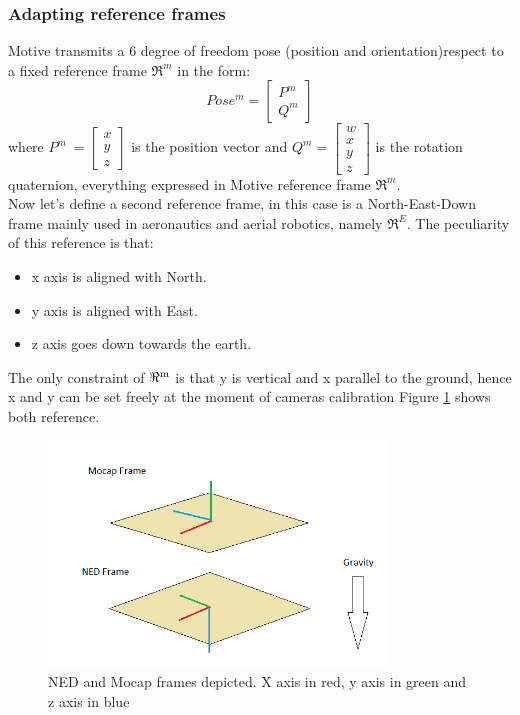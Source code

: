 \subsubsection{Adapting reference frames}
\label{sec:adaptframes}
Motive transmits a 6 degree of freedom pose (position and orientation)respect to a fixed reference frame $\Re^m$ in the form:\\ 
\begin{equation}
Pose^m = \begin{bmatrix}
P^m\\
Q^m
\end{bmatrix}
\end{equation}
 where $P^m\ = \begin{bmatrix}x\\y\\z\end{bmatrix}$ is the position vector and $Q^m =\begin{bmatrix}w\\x\\y\\z\end{bmatrix}$ is the rotation quaternion, everything expressed in Motive reference frame $\Re^m$. \\
 
 \noindent
Now let's define a second reference frame, in this case is a North-East-Down frame \cite{FrameRef}  mainly used in aeronautics and aerial robotics, namely  $\Re^E$. The peculiarity of this reference is that:

\begin{itemize}
\item x axis is aligned with North.
\item y axis is aligned with East.
\item z axis goes down towards the earth.
\end{itemize}

\noindent
The only constraint of $\Re\textsuperscript{m}$ is that y is vertical and x parallel to the ground, hence x and y can be set freely at the moment of cameras calibration Figure \ref{figure:frames} shows both reference.

\begin{figure}[h]
\centering
 \includegraphics[width=0.8\textwidth]{frames.png}
 \caption[NED and Mocap frames]{NED and Mocap frames depicted. X axis in red, y axis in green and z axis in blue}
 \label{figure:frames}
\end{figure}

